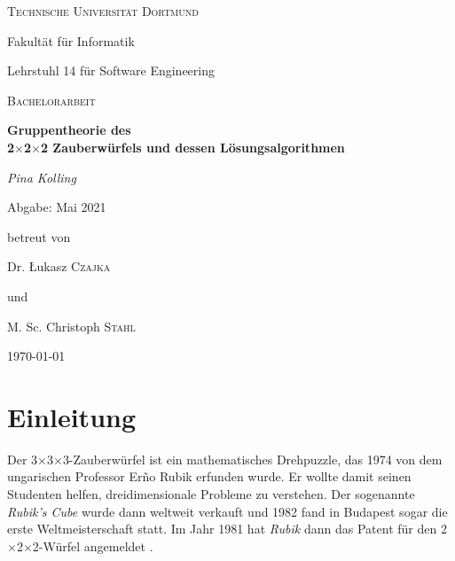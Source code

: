 \documentclass[12pt,a4paper, usenames, dvipsnames]{article}
\newcommand{\Ttwo}{2$\times$2$\times$2-}
\newcommand{\Tthree}{3$\times$3$\times$3-}
\begin{document}
\begin{titlepage}
	\centering
	{\scshape\LARGE Technische Universität Dortmund \par}
	Fakultät für Informatik \par
	Lehrstuhl 14 für Software Engineering \par
	\vspace{1cm}
	{\scshape\Large Bachelorarbeit \par }
	\vspace{1.5cm}
	{\huge\bfseries  Gruppentheorie des \\ 2$\times$2$\times$2 Zauberwürfels und dessen Lösungsalgorithmen \par}
	\vspace{2cm}
	{\Large\itshape Pina Kolling\par}
	\vspace{0.5cm}
	{Abgabe: Mai 2021 \par }
	\vfill
	betreut von\par
	Dr. \L ukasz \textsc{Czajka} \par 
	und \par 
	M. Sc. Christoph \textsc{Stahl} 

	\vfill

	{\large \today\par}
\end{titlepage}

\begin{singlespace}
\tableofcontents
\thispagestyle{empty} 
\end{singlespace}


\thispagestyle{empty} 



\newpage

\setcounter{page}{1} 
%

%
%
%
%
%
%
%
%
%
\section{Einleitung}

Der \Tthree Zauberwürfel ist ein mathematisches Drehpuzzle, das 1974 von dem ungarischen Professor Er\~{n}o Rubik erfunden wurde. Er wollte damit seinen Studenten helfen, dreidimensionale Probleme zu verstehen. 
Der sogenannte \textit{Rubik's Cube} wurde dann weltweit verkauft und 1982 fand in Budapest sogar die erste Weltmeisterschaft statt. \cite{RC}
Im Jahr 1981 hat \textit{Rubik} dann das Patent für den \Ttwo Würfel angemeldet \cite{patent}.
\end{document}
